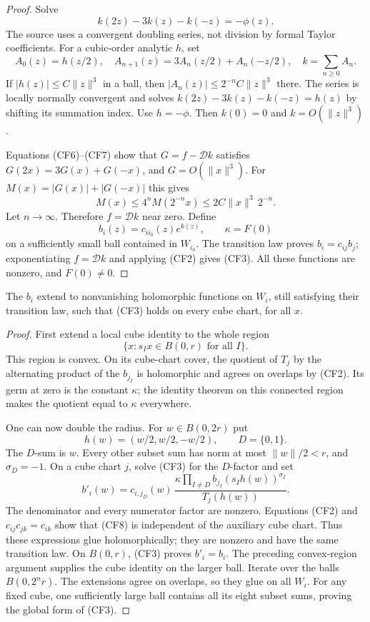 \begin{proof}
Solve
\[
                    k(2z)-3k(z)-k(-z)=-\phi(z).            \tag{CF7}
\]
The source uses a convergent doubling series, not division by formal
Taylor coefficients.  For a cubic-order analytic \(h\), set
\[
 A_0(z)=h(z/2),\quad
 A_{n+1}(z)=3A_n(z/2)+A_n(-z/2),\quad k=\sum_{n\ge0}A_n.
\]
If \(|h(z)|\le C\|z\|^3\) in a ball, then
\(|A_n(z)|\le2^{-n}C\|z\|^3\) there.
The series is locally normally convergent and solves
\(k(2z)-3k(z)-k(-z)=h(z)\) by shifting its summation index.
Use \(h=-\phi\).  Then \(k(0)=0\) and \(k=O(\|z\|^3)\).

Equations (CF6)--(CF7) show that
\(G=f-\mathcal Dk\) satisfies
\(G(2x)=3G(x)+G(-x)\), and \(G=O(\|x\|^3)\).
For \(M(x)=|G(x)|+|G(-x)|\) this gives
\[
 M(x)\le4^n M(2^{-n}x)
               \le2C\|x\|^3\,2^{-n}.
\]
Let \(n\to\infty\).  Therefore \(f=\mathcal Dk\) near zero.
Define
\[
          b_i(z)=c_{ii_0}(z)e^{k(z)},\qquad \kappa=F(0)
\]
on a sufficiently small ball contained in \(W_{i_0}\).
The transition law proves \(b_i=c_{ij}b_j\); exponentiating
\(f=\mathcal Dk\) and applying (CF2) gives (CF3).
All these functions are nonzero, and \(F(0)\ne0\).
\end{proof}

\begin{srlemma}
\label{lem:ftb-cube-global-frame}
The \(b_i\) extend to nonvanishing holomorphic functions on \(W_i\),
still satisfying their transition law, such that (CF3) holds on every
cube chart, for all \(x\).
\end{srlemma}

\begin{proof}
First extend a local cube identity to the whole region
\[
                    \{x:s_Ix\in B(0,r)\text{ for all }I\}.
\]
This region is convex.  On its cube-chart cover, the quotient of
\(T_j\) by the alternating product of the \(b_{j_I}\) is holomorphic
and agrees on overlaps by (CF2).  Its germ at zero is the constant
\(\kappa\); the identity theorem on this connected region makes the
quotient equal to \(\kappa\) everywhere.

One can now double the radius.  For \(w\in B(0,2r)\) put
\[
                     h(w)=(w/2,w/2,-w/2),\qquad D=\{0,1\}.
\]
The \(D\)-sum is \(w\).  Every other subset sum has norm at most
\(\|w\|/2<r\), and \(\sigma_D=-1\).
On a cube chart \(j\), solve (CF3) for the \(D\)-factor and set
\[
 b'_i(w)=c_{i,j_D}(w)\,
      \frac{\kappa\prod_{I\ne D}
                   b_{j_I}(s_Ih(w))^{\sigma_I}}{T_j(h(w))}. \tag{CF8}
\]
The denominator and every numerator factor are nonzero.
Equations (CF2) and \(c_{ij}c_{jk}=c_{ik}\) show that (CF8) is
independent of the auxiliary cube chart.  Thus these expressions
glue holomorphically; they are nonzero and have the same transition
law.  On \(B(0,r)\), (CF3) proves \(b'_i=b_i\).
The preceding convex-region argument supplies the cube identity
on the larger ball.  Iterate over the balls \(B(0,2^nr)\).
The extensions agree on overlaps, so they glue on all \(W_i\).
For any fixed cube, one sufficiently large ball contains all its
eight subset sums, proving the global form of (CF3).
\end{proof}

